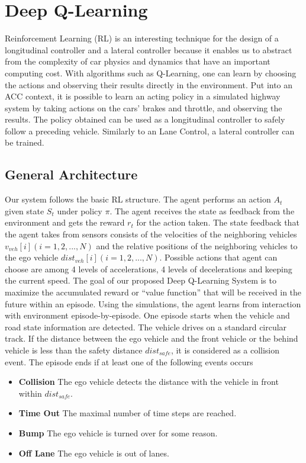 \chapter{Deep Q-Learning}

Reinforcement Learning (RL) is an interesting technique for the design of a longitudinal controller and a lateral controller because it enables us to abstract from the complexity of car physics and dynamics that have an important computing cost. With algorithms such as Q-Learning, one can learn by choosing the actions and observing their results directly in the environment. Put into an ACC context, it is possible to learn an acting policy in a simulated highway system by taking actions on the cars' brakes and throttle, and observing the results. The policy obtained can be used as a longitudinal controller to safely follow a preceding vehicle. Similarly to an Lane Control, a lateral controller can be trained.

\section{General Architecture}

Our system follows the basic RL structure. The agent performs an action $A_t$ given state $S_t$ under policy $\pi$. The agent receives the state as feedback from the environment and gets the reward $r_t$ for the action taken. The state feedback that the agent takes from sensors consists of the velocities of the neighboring vehicles $v_{veh}[i] (i = 1, 2, ..., N)$ and the relative positions of the neighboring vehicles to the ego vehicle $dist_{veh}[i] (i = 1, 2, ..., N)$. Possible actions that agent can choose are among 4 levels of accelerations, 4 levels of decelerations and keeping the current speed. The goal of our proposed Deep Q-Learning System is to maximize the accumulated reward or ``value function'' \cite{Mnih2015AtariNature} that will be received in the future within an episode. Using the simulations, the agent learns from interaction with environment episode-by-episode. One episode starts when the vehicle and road state information are detected. The vehicle drives on a standard circular track. If the distance between the ego vehicle and the front vehicle or the behind vehicle is less than the safety distance $dist_{safe}$, it is considered as a collision event. The episode ends if at least one of the following events occurs

\begin{itemize}

\item \textbf{Collision} The ego vehicle detects the distance with the vehicle in front within $dist_{safe}$.

\item \textbf{Time Out} The maximal number of time steps are reached.

\item \textbf{Bump} The ego vehicle is turned over for some reason.

\item \textbf{Off Lane} The ego vehicle is out of lanes.

\end{itemize}

